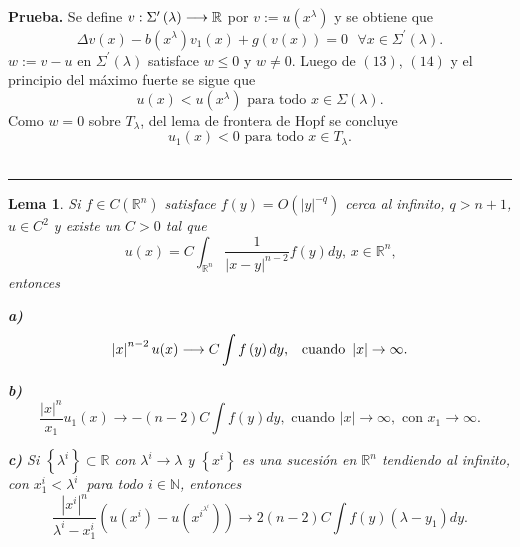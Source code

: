 \documentclass{article}
\newtheorem{lemma}[theorem]{Lema}
\newenvironment{proof}[1][Prueba]{\textbf{#1.} }{\ \rule{0.5em}{0.5em}}
\begin{document}
\begin{proof}
Se define $v:\Sigma ^{\prime }\left( \lambda \right) \longrightarrow \mathbb{%
R}$ por $v:=u\left( x^{\lambda }\right) $ y se obtiene que 
\begin{equation}
\Delta v\left( x\right) -b\left( x^{\lambda }\right) v_{1}\left( x\right)
+g\left( v\left( x\right) \right) =0\text{ \ \ }\forall x\in \Sigma ^{\prime
}\left( \lambda \right) \text{.}  \tag{14}
\end{equation}
$w:=v-u$ en $\Sigma ^{\prime }\left( \lambda \right) $ satisface $w\leq 0$ y 
$w\neq 0$. Luego de $\left( 13\right) $, $\left( 14\right) $ y el principio
del m\'{a}ximo fuerte se sigue que 
\begin{equation*}
u\left( x\right) <u\left( x^{\lambda }\right) \text{ \ \ para todo \ }x\in
\Sigma \left( \lambda \right) .
\end{equation*}
Como $w=0$ sobre $T_{\lambda }$, del lema de frontera de Hopf se concluye 
\begin{equation*}
u_{1}\left( x\right) <0\text{ \ \ para todo \ }x\in T_{\lambda }\text{.}
\end{equation*}
\end{proof}

\begin{lemma}
Si $f\in C(\mathbb{R}^{n})$ satisface $f\left( y\right) =O\left( \left\vert
y\right\vert ^{-q}\right) $ cerca al infinito, \linebreak $q>n+1$, $u\in
C^{2}$ y existe un $C>0$ tal que 
\begin{equation*}
u\left( x\right) =C\int_{\mathbb{R}^{n}}\dfrac{1}{\left\vert x-y\right\vert
^{n-2}}f\left( y\right) dy\text{, \ \ }x\in \mathbb{R}^{n}\text{,}
\end{equation*}
entonces

\textbf{a)} 
\begin{equation*}
\left| x\right| ^{n-2}u(x)\longrightarrow C\int f\left( y\right) dy\text{, \
\ cuando }\left| x\right| \rightarrow \infty .
\end{equation*}

\textbf{b)} 
\begin{equation*}
\frac{\left| x\right| ^{n}}{x_{1}}u_{1}\left( x\right) \longrightarrow
-\left( n-2\right) C\int f\left( y\right) dy,\text{ \ cuando }\left|
x\right| \rightarrow \infty ,\text{\ con }x_{1}\rightarrow \infty \text{.}
\end{equation*}

\textbf{c) }Si $\left\{ \lambda ^{i}\right\} \subset \mathbb{R}$ con $%
\lambda ^{i}\longrightarrow \lambda $ y $\left\{ x^{i}\right\} $ es una
sucesi\'{o}n en $\mathbb{R}^{n}$ tendiendo al infinito, con $%
x_{1}^{i}<\lambda ^{i}$ $\ $para todo $i\in \mathbb{N}$, entonces 
\begin{equation*}
\frac{\left\vert x^{i}\right\vert ^{n}}{\lambda ^{i}-x_{1}^{i}}\left(
u\left( x^{i}\right) -u\left( x^{i^{\lambda ^{i}}}\right) \right)
\longrightarrow 2\left( n-2\right) C\int f\left( y\right) \left( \lambda
-y_{1}\right) dy.
\end{equation*}
\end{lemma}
\end{document}
